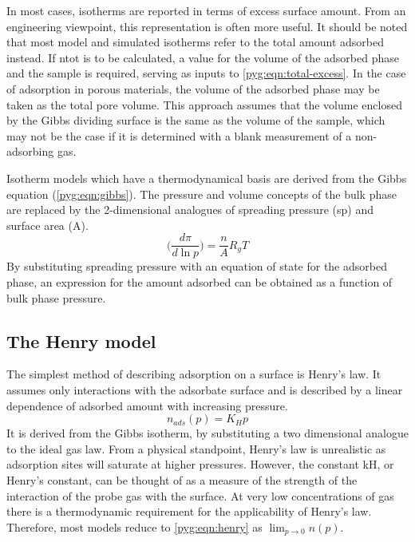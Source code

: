 In most cases, isotherms are reported in terms of excess surface 
amount. From an engineering viewpoint, this representation
is often more useful. It should be noted that most model and simulated
isotherms refer to the total amount adsorbed instead.
If \gls{ntot} is to be calculated, a value
for the volume of the adsorbed phase and the sample is required, 
serving as inputs to \autoref{pyg:eqn:total-excess}.
In the case of adsorption in porous materials, the volume of the
adsorbed phase may be taken as the total pore volume. This approach
assumes that the volume enclosed by the Gibbs dividing surface is
the same as the volume of the sample, which may not be the case 
if it is determined with a blank measurement of a 
non-adsorbing gas.

Isotherm models which have a thermodynamical basis are derived
from the Gibbs equation (\autoref{pyg:eqn:gibbs}). 
The pressure and volume concepts of the bulk phase
are replaced by the 2-dimensional analogues of spreading pressure 
(\gls{sp}) and surface area (\gls{A}).
%
\begin{equation}\label{pyg:eqn:gibbs}
	\Big(\frac{d\pi}{d\ln{p}}\Big) = \frac{n}{A} R_g T
\end{equation}
%
By substituting spreading pressure with an equation
of state for the adsorbed phase, an expression for the amount
adsorbed can be obtained as a function of bulk phase pressure.

\subsection{The Henry model}\label{pyg:models:henry}

The simplest method of describing adsorption on a
surface is Henry’s law. It assumes only interactions
with the adsorbate surface and is described by a
linear dependence of adsorbed amount with
increasing pressure.
%
\begin{equation}\label{pyg:eqn:henry}
	n_{ads}(p) = K_H p
\end{equation}
%
It is derived from the Gibbs isotherm, by substituting
a two dimensional analogue to the ideal gas law.
From a physical standpoint, Henry's law is unrealistic as adsorption sites
will saturate at higher pressures. However, the constant \gls{kH},
or Henry’s constant, can be thought of as a measure of the strength
of the interaction of the probe gas with the surface. At very
low concentrations of gas there is a
thermodynamic requirement for the applicability of Henry's law.
Therefore, most models reduce to \autoref{pyg:eqn:henry}
as \(\lim_{p \to 0} n(p)\).

